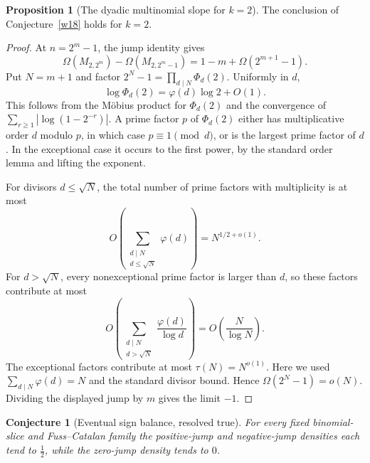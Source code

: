 \documentclass[11pt]{article}
\newtheorem{conjecture}{Conjecture}
\theoremstyle{definition}
\newtheorem{proposition}{Proposition}
\begin{document}
\begin{proposition}[The dyadic multinomial slope for $k=2$]\label{w:k2slope}
The conclusion of Conjecture~\ref{w18} holds for $k=2$.
\end{proposition}

\begin{proof}
At $n=2^m-1$, the jump identity gives
\[
\Omega(M_{2,2^m})-\Omega(M_{2,2^m-1})=1-m+\Omega(2^{m+1}-1).
\]
Put $N=m+1$ and factor $2^N-1=\prod_{d\mid N}\Phi_d(2)$.  Uniformly in $d$,
\[
\log\Phi_d(2)=\varphi(d)\log2+O(1).
\]
This follows from the M\"obius product for $\Phi_d(2)$ and the convergence of $\sum_{r\ge1}|\log(1-2^{-r})|$.  A prime factor $p$ of $\Phi_d(2)$ either has multiplicative order $d$ modulo $p$, in which case $p\equiv1\pmod d$, or is the largest prime factor of $d$.  In the exceptional case it occurs to the first power, by the standard order lemma and lifting the exponent.

For divisors $d\le\sqrt N$, the total number of prime factors with multiplicity is at most
\[
O\left(\sum_{\substack{d\mid N\\d\le\sqrt N}}\varphi(d)\right)
=N^{1/2+o(1)}.
\]
For $d>\sqrt N$, every nonexceptional prime factor is larger than $d$, so these factors contribute at most
\[
O\left(\sum_{\substack{d\mid N\\d>\sqrt N}}\frac{\varphi(d)}{\log d}\right)
=O\left(\frac{N}{\log N}\right).
\]
The exceptional factors contribute at most $\tau(N)=N^{o(1)}$.  Here we used $\sum_{d\mid N}\varphi(d)=N$ and the standard divisor bound.  Hence $\Omega(2^N-1)=o(N)$.  Dividing the displayed jump by $m$ gives the limit $-1$.
\end{proof}

\begin{conjecture}[Eventual sign balance, resolved true]\label{w19}
For every fixed binomial-slice and Fuss--Catalan family the positive-jump and negative-jump densities each tend to $\tfrac12$, while the zero-jump density tends to $0$.
\end{conjecture}
\end{document}
